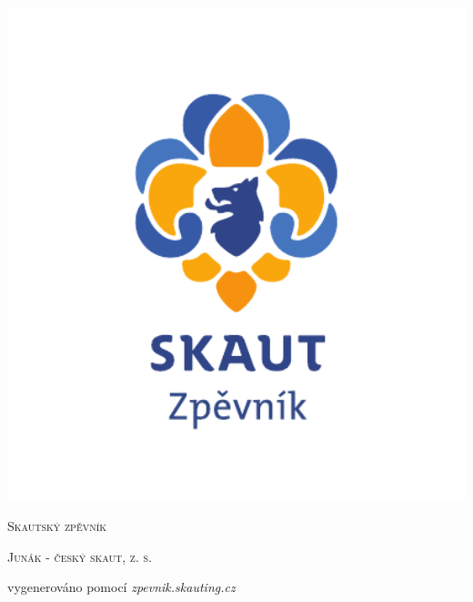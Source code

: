 \documentclass[12pt, a5paper]{report}
\begin{document}
\begin{titlepage}
	{\centering
	\includegraphics[width=1\textwidth]{Logo/Logo2-barevne.pdf}\par\vspace{1cm}
	{\scshape\LARGE Skautský zpěvník \par}
	\vspace{1cm}
	{\scshape\normalsize Junák - český skaut, z. s.\par}}

	\vfill

	{\setmainfont{TheMix C5 SemiLight}\footnotesize vygenerováno pomocí \textit{zpevnik.skauting.cz}}

\end{titlepage}
\end{document}
